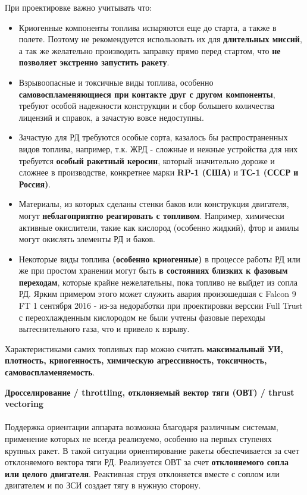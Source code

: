 \documentclass{article}
\begin{document}
\begin{enumerate}
{    При проектировке важно учитывать что: \begin{itemize}
        \item Криогенные компоненты топлива испаряются еще до старта, а также в полете. Поэтому не рекомендуется использовать их для \textbf{длительных миссий}, а так же желательно производить заправку прямо перед стартом, что \textbf{не позволяет экстренно запустить ракету}.
        \item Взрывоопасные и токсичные виды топлива, особенно \textbf{самовоспламеняющиеся при контакте друг с другом компоненты}, требуют особой надежности конструкции и сбор большего количества лицензий и справок, а зачастую вовсе недоступны.
        \item Зачастую для РД требуются особые сорта, казалось бы распространенных видов топлива, например, т.к. ЖРД - сложные и нежные устройства для них требуется \textbf{особый ракетный керосин}, который значительно дороже и сложнее в производстве, конкретнее марки \textbf{RP-1 (США)} и \textbf{ТС-1 (СССР и Россия)}.
        \item Материалы, из которых сделаны стенки баков или конструкция двигателя, могут \textbf{неблагоприятно реагировать с топливом}. Например, химически активные окислители, такие как кислород (особенно жидкий), фтор и амилы могут окислять элементы РД и баков.
        \item Некоторые виды топлива \textbf{(особенно криогенные)} в процессе работы РД или же при простом хранении могут быть \textbf{в состояниях близких к фазовым переходам}, которые крайне нежелательны, пока топливо не выйдет из сопла РД. Ярким примером этого может служить авария произошедшая с Falcon 9 FT 1 сентября 2016 - из-за недоработки при проектировки верссии Full Trust с переохлажденным кислородом не были учтены фазовые переходы вытеснительного газа, что и привело к взрыву.
    \end{itemize}
    Характеристиками самих топливых пар можно считать \textbf{максимальный УИ, плотность, криогенность, химическую агрессивность, токсичность, самовоспламеняемость}. \\
    \item \textbf{Дросселирование / throttling, отклоняемый вектор тяги (ОВТ) / thrust vectoring} \\ \\
    Поддержка ориентации аппарата возможна благодаря различным системам, применение которых не всегда реализуемо, особенно на первых ступенях крупных ракет. В такой ситуации ориентирование ракеты обеспечивается за счет отклоняемого вектора тяги РД. Реализуется ОВТ за счет \textbf{отклоняемого сопла или целого двигателя}. Реактивная струя отклоняется вместе с соплом или двигателем и по ЗСИ создает тягу в нужную сторону.
}
\end{enumerate}
\end{document}
